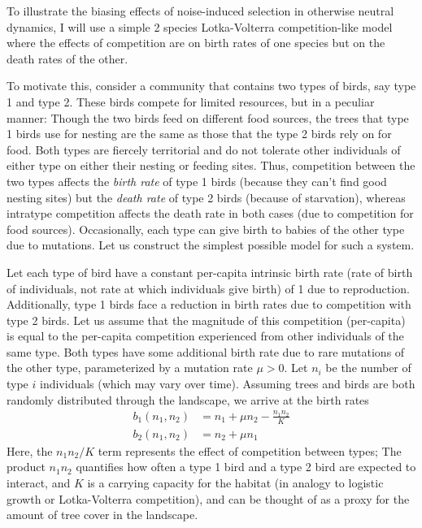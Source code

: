 To illustrate the biasing effects of noise-induced selection in otherwise neutral dynamics, I will use a simple 2 species Lotka-Volterra competition-like model where the effects of competition are on birth rates of one species but on the death rates of the other.

To motivate this, consider a community that contains two types of birds, say type 1 and type  2. These birds compete for limited resources, but in a peculiar manner: Though the two birds feed on different food sources, the trees that type 1 birds use for nesting are the same as those that the type 2 birds rely on for food. Both types are fiercely territorial and do not tolerate other individuals of either type on either their nesting or feeding sites. Thus, competition between the two types affects the \emph{birth rate} of type 1 birds (because they can't find good nesting sites) but the \emph{death rate} of type 2 birds (because of starvation), whereas intratype competition affects the death rate in both cases (due to competition for food sources). Occasionally, each type can give birth to babies of the other type due to mutations. Let us construct the simplest possible model for such a system.

Let each type of bird have a constant per-capita intrinsic birth rate (rate of birth of individuals, not rate at which individuals give birth) of 1 due to reproduction. Additionally, type 1 birds face a reduction in birth rates due to competition with type 2 birds. Let us assume that the magnitude of this competition (per-capita) is equal to the per-capita competition experienced from other individuals of the same type. Both types have some additional birth rate due to rare mutations of the other type, parameterized by a mutation rate $\mu > 0$. Let $n_i$ be the number of type $i$ individuals (which may vary over time). Assuming trees and birds are both randomly distributed through the landscape, we arrive at the birth rates
\begin{equation}
\label{App_example_stoch_LV_birth_rates}
\begin{aligned}
	b_{1}({n_1},{n_2}) &= {n_1} + \mu n_2 - \frac{{n_1}{n_2}}{K}\\
	b_{2}({n_1},{n_2}) &= {n_2} + \mu n_1
\end{aligned}
\end{equation}
Here, the ${n_1}{n_2}/K$ term represents the effect of competition between types; The product ${n_1}{n_2}$ quantifies how often a type 1 bird and a type 2 bird are expected to interact, and $K$ is a carrying capacity for the habitat (in analogy to logistic growth or Lotka-Volterra competition), and can be thought of as a proxy for the amount of tree cover in the landscape.

